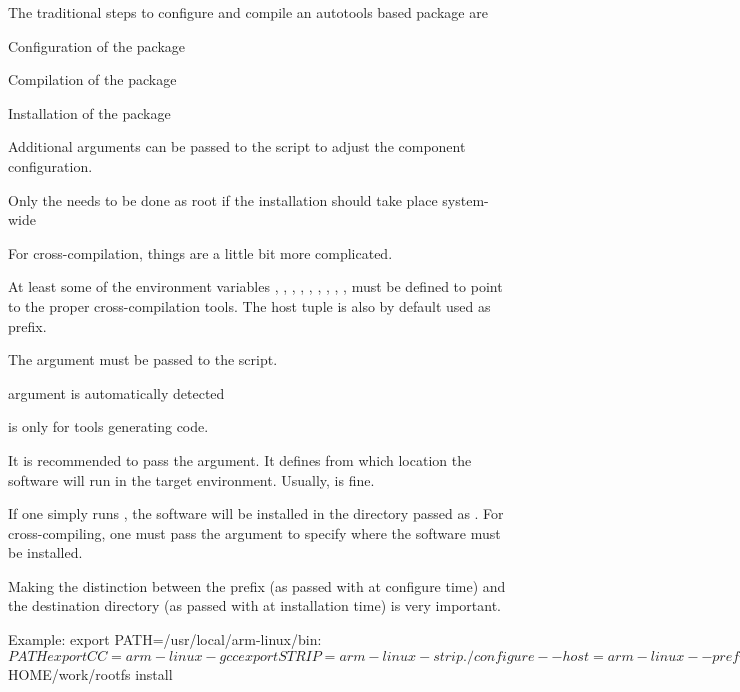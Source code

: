   \startitemize
  \item The traditional steps to configure and compile an autotools
    based package are
    \startitemize
    \item Configuration of the package\\
    \item Compilation of the package\\
    \item Installation of the package\\
    \stopitemize
  \item Additional arguments can be passed to the 
    script to adjust the component configuration.
  \item Only the  needs to be done as root if the
    installation should take place system-wide
  \stopitemize

  \startitemize
  \item For cross-compilation, things are a little bit more complicated.
  \item At least some of the environment variables ,
    , , , , ,
    , , ,  must be
    defined to point to the proper cross-compilation tools. The host
    tuple is also by default used as prefix.
  \item The  argument must be passed to the  script.
    \startitemize
    \item {} argument is automatically detected
    \item {} is only for tools generating code.
    \stopitemize
  \item It is recommended to pass the  argument. It
    defines from which location the software will run in the target
    environment. Usually,  is fine.
  \stopitemize

  \startitemize
  \item If one simply runs , the software will be
    installed in the directory passed as . For
    cross-compiling, one must pass the  argument to
    specify where the software must be installed.
  \item Making the distinction between the prefix (as passed with
     at configure time) and the destination directory (as
    passed with  at installation time) is very important.
  \item Example:
\starttyping
export PATH=/usr/local/arm-linux/bin:$PATH
export CC=arm-linux-gcc
export STRIP=arm-linux-strip
./configure --host=arm-linux --prefix=/usr
make
make DESTDIR=$HOME/work/rootfs install
\stoptyping
  \stopitemize

